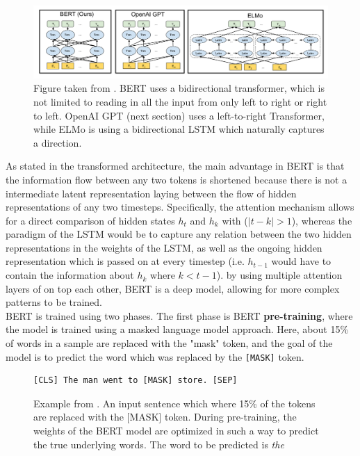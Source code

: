 \documentclass[a4paper,12pt,twoside,openright]{report}
\begin{document}
\begin{figure}[H]
	\center
  \includegraphics[width=\linewidth]{./assets/background/BERT_GPT_ELMo.png}
  \caption{Figure taken from \cite{devlin18}. BERT uses a bidirectional transformer, which is not limited to reading in all the input from only left to right or right to left. OpenAI GPT (next section) uses a left-to-right Transformer, while ELMo is using a bidirectional LSTM which naturally captures a direction. }
  \label{fig:attention_is_all_you_need}
\end{figure}


As stated in the transformed architecture, the main advantage in BERT is that the information flow between any two tokens is shortened because there is not a intermediate latent representation laying between the flow of hidden representations of any two timesteps.
Specifically, the attention mechanism allows for a direct comparison of hidden states $h_t$ and $h_k$ with ($|t - k| > 1$), whereas the paradigm of the LSTM would be to capture any relation between the two hidden representations in the weights of the LSTM, as well as the ongoing hidden representation which is passed on at every timestep (i.e. $h_{t-1}$ would have to contain the information about $h_k$ where $k < t - 1$).
by using multiple attention layers of on top each other, BERT is a deep model, allowing for more complex patterns to be trained. \\

BERT is trained using two phases. 
The first phase is BERT \textbf{pre-training}, where the model is trained using a masked language model approach. 
Here, about 15\% of words in a sample are replaced with the "mask" token, and the goal of the model is to predict the word which was replaced by the \Verb#[MASK]# token.

\begin{figure}[H]
\begin{verbatim}
[CLS] The man went to [MASK] store. [SEP]
\end{verbatim}
\caption{Example from \cite{devlin18}. 
An input sentence which where 15\% of the tokens are replaced with the [MASK] token. 
During pre-training, the weights of the BERT model are optimized in such a way to predict the true underlying words.
The word to be predicted is \textit{the}
}
\end{figure}
\end{document}
